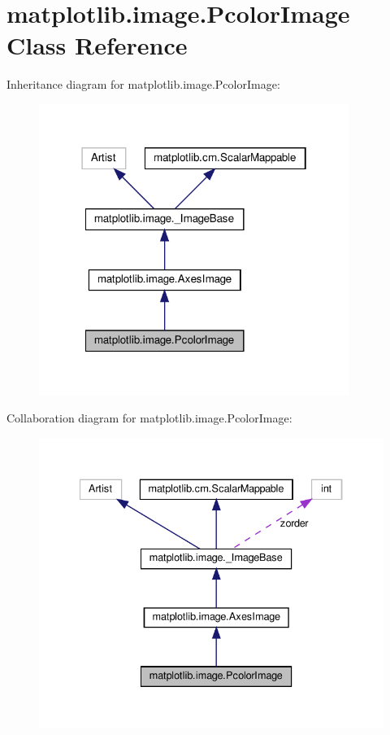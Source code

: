 \hypertarget{classmatplotlib_1_1image_1_1PcolorImage}{}\section{matplotlib.\+image.\+Pcolor\+Image Class Reference}
\label{classmatplotlib_1_1image_1_1PcolorImage}


Inheritance diagram for matplotlib.\+image.\+Pcolor\+Image\+:
\nopagebreak
\begin{figure}[H]
\begin{center}
\leavevmode
\includegraphics[width=286pt]{classmatplotlib_1_1image_1_1PcolorImage__inherit__graph}
\end{center}
\end{figure}


Collaboration diagram for matplotlib.\+image.\+Pcolor\+Image\+:
\nopagebreak
\begin{figure}[H]
\begin{center}
\leavevmode
\includegraphics[width=334pt]{classmatplotlib_1_1image_1_1PcolorImage__coll__graph}
\end{center}
\end{figure}
